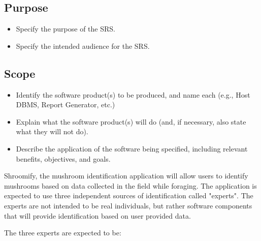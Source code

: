 \documentclass[]{article}
\begin{document}
\subsection{Purpose}
\label{sub:purpose}
\begin{itemize}
	\item Specify the purpose of the SRS.
	\item Specify the intended audience for the SRS.
\end{itemize}

\subsection{Scope}
\label{sub:scope}
\begin{itemize}
	\item Identify the software product(s) to be produced, and name each (e.g., Host DBMS, Report Generator, etc.)
	\item Explain what the software product(s) will do (and, if necessary, also state what they will not do).
	\item Describe the application of the software being specified, including relevant benefits, objectives, and goals.
\end{itemize}

\noindent
Shroomify, the mushroom identification application will allow users to identify mushrooms based on data collected in the field while foraging. The application is expected to use three
independent sources of identification called "experts". The experts are not intended to be real individuals, but rather software components that will provide identification based on user provided data. 

\vspace{0.5cm}
\noindent
The three experts are expected to be:
\end{document}
